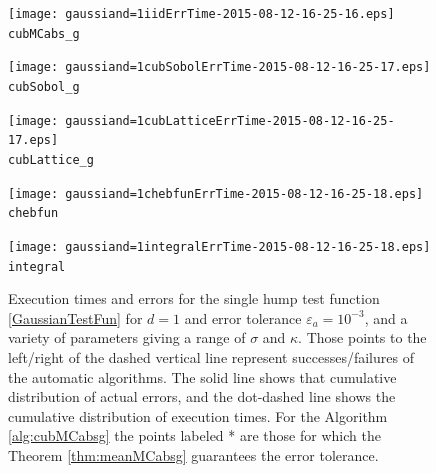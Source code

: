 \documentclass{iitthesis}
\theoremstyle{definition}
\begin{document}
\begin{figure}
\centering
\begin{minipage}{9cm} \centering \texttt{[image: gaussiand=1iidErrTime-2015-08-12-16-25-16.eps]} \\ {\tt cubMCabs\_g}  \end{minipage}
\begin{minipage}{7cm} \centering \texttt{[image: gaussiand=1cubSobolErrTime-2015-08-12-16-25-17.eps]} \\  {\tt cubSobol\_g}\end{minipage}
\begin{minipage}{7cm} \centering \texttt{[image: gaussiand=1cubLatticeErrTime-2015-08-12-16-25-17.eps]} \\ {\tt cubLattice\_g} \end{minipage}
\begin{minipage}{7cm} \centering \texttt{[image: gaussiand=1chebfunErrTime-2015-08-12-16-25-18.eps]} \\ {\tt chebfun} \end{minipage}
\begin{minipage}{7cm} \centering \texttt{[image: gaussiand=1integralErrTime-2015-08-12-16-25-18.eps]} \\ {\tt integral} \end{minipage}
\caption{Execution times and errors for the single hump test function \eqref{GaussianTestFun} for $d=1$ and error tolerance $\varepsilon_a=10^{-3}$, and a variety of parameters giving a range of $\sigma$ and $\kappa$. Those points to the left/right of the dashed vertical line represent successes/failures of the automatic algorithms.  The solid line shows that cumulative distribution of actual errors, and the dot-dashed line shows the cumulative distribution of execution times.  For the Algorithm \ref{alg:cubMCabsg} the points labeled * are those for which the Theorem \ref{thm:meanMCabsg} guarantees the error tolerance.\label{fig:GaussianTestFun} }
\end{figure}
\end{document}
